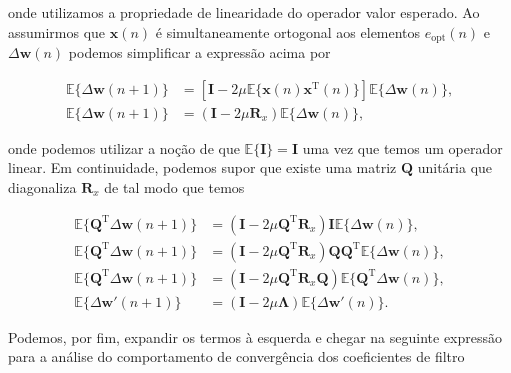 \begin{enumerate}
        onde utilizamos a propriedade de linearidade do operador valor esperado. Ao assumirmos que $\mathbf{x}(n)$ é simultaneamente ortogonal aos elementos $e_{\text{opt}}(n)$ e $\Delta \mathbf{w}(n)$ podemos simplificar a expressão acima por
        
        \begin{align}
            \mathbb{E}\{\Delta \mathbf{w}(n + 1)\} &= \left[ \mathbf{I} - 2 \mu \mathbb{E}\{\mathbf{x}(n) \mathbf{x}^{\text{T}}(n)\} \right] \mathbb{E}\{\Delta \mathbf{w}(n)\}, \\
            \mathbb{E}\{\Delta \mathbf{w}(n + 1)\} &= \left( \mathbf{I} - 2 \mu \mathbf{R}_{x} \right) \mathbb{E}\{\Delta \mathbf{w}(n)\},
        \end{align}

        onde podemos utilizar a noção de que $\mathbb{E}\{ \mathbf{I} \} = \mathbf{I}$ uma vez que temos um operador linear. Em continuidade, podemos supor que existe uma matriz $\mathbf{Q}$ unitária que diagonaliza $\mathbf{R}_{x}$
        de tal modo que temos 

        \begin{align}
            \mathbb{E}\{ \mathbf{Q}^{\text{T}} \Delta \mathbf{w}(n + 1) \} &= \left( \mathbf{I} - 2 \mu \mathbf{Q}^{\text{T}} \mathbf{R}_{x} \right) \mathbf{I} \mathbb{E}\{ \Delta \mathbf{w}(n)\}, \\
            \mathbb{E}\{ \mathbf{Q}^{\text{T}} \Delta \mathbf{w}(n + 1) \} &= \left( \mathbf{I} - 2 \mu \mathbf{Q}^{\text{T}} \mathbf{R}_{x} \right) \mathbf{Q} \mathbf{Q}^{\text{T}} \mathbb{E}\{ \Delta \mathbf{w}(n)\}, \\
            \mathbb{E}\{ \mathbf{Q}^{\text{T}} \Delta \mathbf{w}(n + 1) \} &= \left( \mathbf{I} - 2 \mu \mathbf{Q}^{\text{T}} \mathbf{R}_{x} \mathbf{Q} \right) \mathbb{E}\{ \mathbf{Q}^{\text{T}} \Delta \mathbf{w}(n)\}, \\
            \mathbb{E}\{\Delta \mathbf{w}'(n + 1)\} &= \left( \mathbf{I} - 2 \mu \mathbf{\Lambda} \right) \mathbb{E}\{\Delta \mathbf{w}'(n)\}.
        \end{align}

        Podemos, por fim, expandir os termos à esquerda e chegar na seguinte expressão para a análise do comportamento de convergência dos coeficientes de filtro


\end{enumerate}
